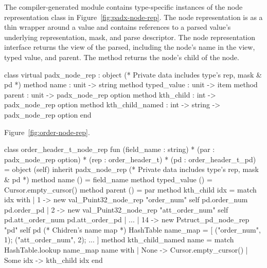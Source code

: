 The compiler-generated module contains type-specific instances of the
node representation class in Figure~\ref{fig:padx-node-rep}.  The node
representation is as a thin wrapper around a \pads{} value and
contains references to a parsed value's underlying representation,
mask, and parse descriptor.  The node representation interface returns
the \Xml{} view of the parsed, including the node's name in the \Xml{}
view, typed value, and parent.  The  method returns
the node's  child of the node. 
\begin{figure*}
\begin{small}
\begin{code}
class virtual padx\_node\_rep :
  object 
    (* Private data includes type's rep, mask \& pd *)
    method name        : unit -> string
    method typed_value : unit -> item
    method parent      : unit -> padx\_node\_rep option
    method kth_child   : int -> padx\_node\_rep option
    method kth_child_named : int -> string -> padx\_node\_rep option
  end
\end{code}
\end{small}
\caption{The \padx{} abstract node representation}
\label{fig:padx-node-rep}
\end{figure*}

Figure~\ref{fig:order-node-rep}.
\begin{figure*}
\begin{small}
\begin{code}
class order\_header\_t\_node\_rep 
  fun (field\_name : string) * 
      (par : padx\_node\_rep option) * 
      (rep : order\_header\_t) * 
      (pd : order\_header\_t\_pd) = 
  object (self) 
    inherit padx\_node\_rep
    (* Private data includes type's rep, mask \& pd *)
    method name        () = field\_name
    method typed_value () = Cursor.empty_cursor()
    method parent      () = par 
    method kth_child   idx = 
      match idx with 
      | 1 -> new val\_Puint32\_node\_rep "order\_num" self pd.order\_num pd.order\_pd %
      | 2 -> new val\_Puint32\_node\_rep "att\_order\_num" self pd.att\_order\_num pd.att\_order\_pd %
      | ...
      | 14 -> new Pstruct\_pd\_node\_rep "pd" self pd
    (* Chidren's name map *)
    HashTable name_map = [ ("order\_num", 1); ("att\_order\_num", 2); ... ]
    method kth_child_named name =
      match HashTable.lookup name\_map name with
      | None -> Cursor.empty_cursor()
      | Some idx -> kth_child idx 
  end
\end{code}
\end{small}
\caption{Fragment of compiler-generated node representation for order\_header\_t}
\label{fig:order-node-rep}
\end{figure*}

